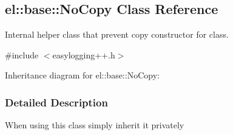 \hypertarget{a00059}{}\subsection{el\+:\+:base\+:\+:No\+Copy Class Reference}
\label{a00059}


Internal helper class that prevent copy constructor for class.  




{\ttfamily \#include $<$easylogging++.\+h$>$}



Inheritance diagram for el\+:\+:base\+:\+:No\+Copy\+:


\subsubsection{Detailed Description}
When using this class simply inherit it privately 